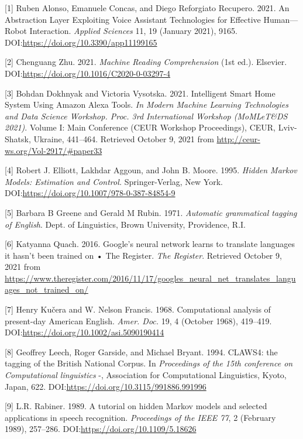 \documentclass[oneside,14pt,a4paper]{extreport}
\begin{document}
\begin{hangparas}{1.7em}{1}

[1] Ruben Alonso, Emanuele Concas, and Diego Reforgiato Recupero. 2021. An Abstraction Layer Exploiting Voice Assistant Technologies for Effective Human—Robot Interaction. \textit{Applied Sciences} 11, 19 (January 2021), 9165. DOI:\url{https://doi.org/10.3390/app11199165}

[2] Chenguang Zhu. 2021. \textit{Machine Reading Comprehension} (1st ed.). Elsevier. DOI:\url{https://doi.org/10.1016/C2020-0-03297-4}

[3] Bohdan Dokhnyak and Victoria Vysotska. 2021. Intelligent Smart Home System Using Amazon Alexa Tools. \textit{In Modern Machine Learning Technologies and Data Science Workshop. Proc. 3rd International Workshop (MoMLeT\&DS 2021)}. Volume I: Main Conference (CEUR Workshop Proceedings), CEUR, Lviv-Shatsk, Ukraine, 441–464. Retrieved October 9, 2021 from \url{http://ceur-ws.org/Vol-2917/#paper33}

[4] Robert J. Elliott, Lakhdar Aggoun, and John B. Moore. 1995. \textit{Hidden Markov Models: Estimation and Control.} Springer-Verlag, New York. DOI:\url{https://doi.org/10.1007/978-0-387-84854-9}

[5] Barbara B Greene and Gerald M Rubin. 1971. \textit{Automatic grammatical tagging of English}. Dept. of Linguistics, Brown University, Providence, R.I.

[6] Katyanna Quach. 2016. Google’s neural network learns to translate languages it hasn’t been trained on • The Register. \textit{The Register}. Retrieved October 9, 2021 from \url{https://www.theregister.com/2016/11/17/googles\_neural\_net\_translates\_languages\_not\_trained\_on/}

[7] Henry Kučera and W. Nelson Francis. 1968. Computational analysis of present-day American English. \textit{Amer. Doc.} 19, 4 (October 1968), 419–419. DOI:\url{https://doi.org/10.1002/asi.5090190414}

[8] Geoffrey Leech, Roger Garside, and Michael Bryant. 1994. CLAWS4: the tagging of the British National Corpus. In \textit{Proceedings of the 15th conference on Computational linguistics} -, Association for Computational Linguistics, Kyoto, Japan, 622. DOI:\url{https://doi.org/10.3115/991886.991996}

[9] L.R. Rabiner. 1989. A tutorial on hidden Markov models and selected applications in speech recognition. \textit{Proceedings of the IEEE 77}, 2 (February 1989), 257–286. DOI:\url{https://doi.org/10.1109/5.18626}

\end{hangparas}
\end{document}
